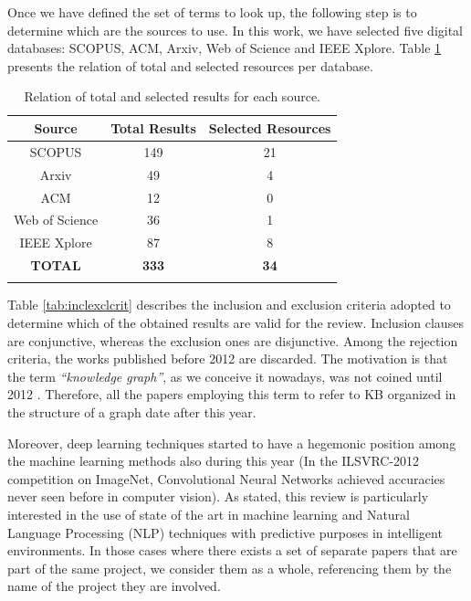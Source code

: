 Once we have defined the set of terms to look up, the following step is to determine which are the sources to use. In this work, we have selected five digital databases: SCOPUS, ACM, Arxiv, Web of Science and IEEE Xplore. Table \ref{tab1} presents the relation of total and selected resources per database. 
 \unskip
\begin{table}[H]
\caption{Relation of total and selected results for each source.}
\centering
\begin{tabular}{ccc}
\toprule
\textbf{Source} & \textbf{Total Results} & \textbf{Selected Resources} \\ 
\midrule
SCOPUS          & 149                    & 21\\                           
Arxiv           & 49                     & 4\\                            
ACM             & 12                     & 0\\                           
Web of Science  & 36                     & 1\\                            
IEEE Xplore     & 87                     & 8\\                            
\textbf{TOTAL}  & \textbf{333}           & \textbf{34}\\               
\bottomrule
\label{tab1}
\end{tabular}
\end{table}
\unskip
Table \ref{tab:inclexclcrit} describes the inclusion and exclusion criteria adopted to determine which of the obtained results are valid for the review. Inclusion clauses are conjunctive, whereas the exclusion ones are disjunctive. Among the rejection criteria, the works published before 2012 are discarded. The motivation is that the term \textit{``knowledge graph''}, as we conceive it nowadays, was not coined until 2012 \citep{googlekg}. Therefore, all the papers employing this term to refer to KB organized in the structure of a graph date after this year. 

Moreover, deep learning techniques started to have a hegemonic position among  the machine learning methods also during this year (In the ILSVRC-2012 competition on ImageNet, Convolutional Neural Networks achieved accuracies never seen before in computer vision). As stated, this review is particularly interested in the use of state of the art in machine learning and Natural Language Processing (NLP) techniques with predictive purposes in intelligent environments. In those cases where there exists a set of separate papers that are part of the same project, we consider them as a whole, referencing them by the name of the project they are involved. %

